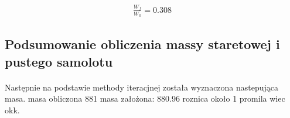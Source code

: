         \begin{align}
            \frac{W_{f}}{W_{0}} = 0.308
        \end{align}

    \subsection{Podsumowanie obliczenia massy staretowej i pustego samolotu}

        \paragraph{}
            Następnie na podstawie methody iteracjnej została wyznaczona nastepująca masa.
            masa obliczona 881 masa założona: 880.96 roznica około 1 promila wiec okk.